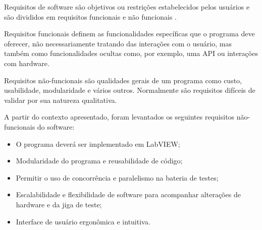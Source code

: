         Requisitos de software são objetivos ou restrições estabelecidos pelos usuários e são divididos em requisitos funcionais e não funcionais \citep{bourque2014guide}.
        
        Requisitos funcionais definem as funcionalidades específicas que o programa deve oferecer, não necessariamente tratando das interações com o usuário, mas também como funcionalidades ocultas como, por exemplo, uma API ou interações com hardware.
        
        Requisitos não-funcionais são qualidades gerais de um programa como custo, usabilidade, modularidade e vários outros. Normalmente são requisitos difíceis de validar por sua natureza qualitativa. 
        
        A partir do contexto apresentado, foram levantados os seguintes requisitos não-funcionais do software:
        \begin{itemize}
            \item O programa deverá ser implementado em LabVIEW;
            \item Modularidade do programa e reusabilidade de código;
            \item Permitir o uso de concorrência e paralelismo na bateria de testes;
            \item Escalabilidade e flexibilidade de software para acompanhar alterações de hardware e da jiga de teste;
            \item Interface de usuário ergonômica e intuitiva.
        \end{itemize}
        
